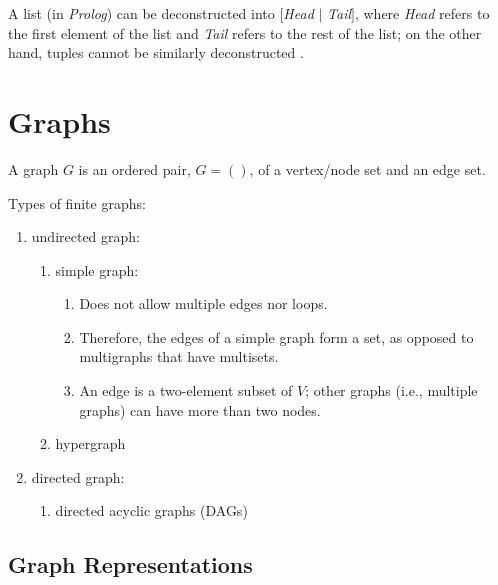 A list (in {\it Prolog}) can be deconstructed into $[${\it Head} $|$ {\it Tail}$]$, where {\it Head} refers to the first element of the list and {\it Tail} refers to the rest of the list; on the other hand, tuples cannot be similarly deconstructed \cite[\S4.3 pp. 113]{Tate2010}.





\section{Graphs}
\label{sec:Graphs}

A graph $G$ is an ordered pair, $G = ()$, of a vertex/node set and an edge set.

Types of finite graphs: \vspace{-0.3cm}
\begin{enumerate} \itemsep -4pt
\item undirected graph: \vspace{-0.3cm}
	\begin{enumerate} \itemsep -2pt
	\item simple graph: \vspace{-0.2cm}
		\begin{enumerate} \itemsep -2pt
		\item Does not allow multiple edges nor loops.
		\item Therefore, the edges of a simple graph form a set, as opposed to multigraphs that have multisets.
		\item An edge is a two-element subset of $V$; other graphs (i.e., multiple graphs) can have more than two nodes.
		\end{enumerate}
	\item hypergraph
	\end{enumerate}
\item directed graph: \vspace{-0.3cm}
	\begin{enumerate} \itemsep -2pt
	\item directed acyclic graphs (DAGs)
	\end{enumerate}
\end{enumerate}


\subsection{Graph Representations}
\label{ssec:GraphRepresentations}

